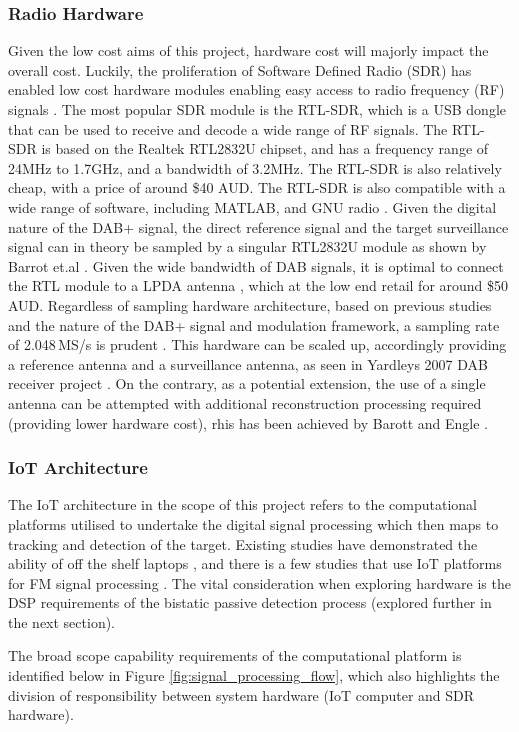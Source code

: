 \documentclass[12pt,a4paper]{article}
\begin{document}
\subsubsection{Radio Hardware}
Given the low cost aims of this project, hardware cost will majorly impact the overall cost. Luckily, the proliferation of Software Defined Radio (SDR) has enabled low cost hardware modules enabling easy access to radio frequency (RF) signals \cite{SDRtheory}. The most popular SDR module is the RTL-SDR, which is a USB dongle that can be used to receive and decode a wide range of RF signals. The RTL-SDR is based on the Realtek RTL2832U chipset, and has a frequency range of 24MHz to 1.7GHz, and a bandwidth of 3.2MHz. The RTL-SDR is also relatively cheap, with a price of around \$40 AUD. The RTL-SDR is also compatible with a wide range of software, including MATLAB, and GNU radio \cite{SDRdongle}. Given the digital nature of the DAB+ signal, the direct reference signal and the target surveillance signal can in theory be sampled by a singular RTL2832U module as shown by Barrot et.al \cite{DABsingleRadar}. Given the wide bandwidth of DAB signals, it is optimal to connect the RTL module to a LPDA antenna \cite{AntennaHW}, which at the low end retail for around \$50 AUD. Regardless of sampling hardware architecture, based on previous studies and the nature of the DAB+ signal and modulation framework, a sampling rate of 2.048\,MS/s is prudent \cite{IOTpassiveRadar}. This hardware can be scaled up, accordingly providing a reference antenna and a surveillance antenna, as seen in Yardleys 2007 DAB receiver project \cite{antennaArchitecture}. On the contrary, as a potential extension, the use of a single antenna can be attempted with additional reconstruction processing required (providing lower hardware cost), rhis has been achieved by Barott and Engle \cite{DABsingleRadar}.

\subsubsection{IoT Architecture}
The IoT architecture in the scope of this project refers to the computational platforms utilised to undertake the digital signal processing which then maps to tracking and detection of the target. Existing studies have demonstrated the ability of off the shelf laptops \cite{FMlowCost}, and there is a few studies that use IoT platforms for FM signal processing \cite{IOTpassiveRadar}. The vital consideration when exploring hardware is the DSP requirements of the bistatic passive detection process (explored further in the next section).
\par \vspace{0.5cm} 
\noindent The broad scope capability requirements of the computational platform is identified below in Figure \ref{fig:signal_processing_flow}, which also highlights the division of responsibility between system hardware (IoT computer and SDR hardware).
\end{document}
